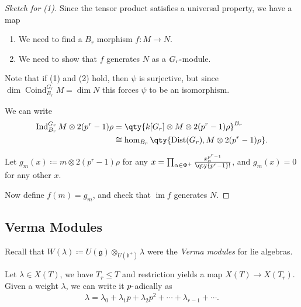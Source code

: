 \begin{proof}[Sketch for (1)]

Since the tensor product satisfies a universal property, we have a map

\begin{center}
\end{center}

\begin{enumerate}
\def\labelenumi{\arabic{enumi}.}
\item
  We need to find a \(B_r\) morphism \(f:M\to N\).
\item
  We need to show that \(f\) generates \(N\) as a
  \(G_r{\hbox{-}}\)module.
\end{enumerate}

Note that if (1) and (2) hold, then \(\psi\) is surjective, but since
\(\dim \operatorname{Coind}_{B_r}^{G_r} M= \dim N\) this forces \(\psi\)
to be an isomorphism.

We can write
\begin{align*}  
\operatorname{Ind}_{B_r}^{G_r} M\otimes 2(p^r-1) \rho
&=
\qty{ k[G_r] \otimes M \otimes 2(p^r-1) \rho  }^{B_r} \\
&\cong
\hom_{B_r}\qty{\operatorname{Dist}(G_r), M\otimes 2(p^r-1)\rho }
.\end{align*}

Let \(g_m(x) \coloneqq m\otimes 2(p^r-1)\rho\) for any
\(x =\prod_{\alpha\in\Phi^+} {x_\alpha^{p^r-1} \over \qty{p^r-1}! }\),
and \(g_m(x) = 0\) for any other \(x\).

Now define \(f(m) = g_m\), and check that \(\operatorname{im}f\)
generates \(N\).

\end{proof}

\hypertarget{verma-modules}{%
\subsection{Verma Modules}\label{verma-modules}}

Recall that
\(W(\lambda) \coloneqq U({\mathfrak{g}}) \otimes_{U({\mathfrak{b}}^+)} \lambda\)
were the \emph{Verma modules} for lie algebras.

Let \(\lambda \in X(T)\), we have \(T_r \leq T\) and restriction yields
a map \(X(T) \to X(T_r)\). Given a weight \(\lambda\), we can write it
\(p{\hbox{-}}\)adically as
\begin{align*}  
\lambda = \lambda_0 + \lambda_1 p + \lambda_2 p^2 + \cdots + \lambda_{r-1} + \cdots
.\end{align*}

